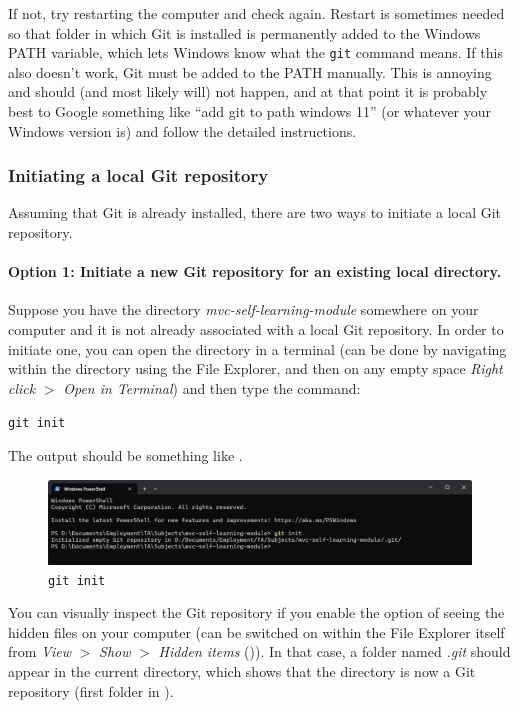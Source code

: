 \documentclass[a4paper,10pt]{article}
\begin{document}
If not, try restarting the computer and check again. Restart is sometimes needed so that folder in which Git is installed is permanently added to the Windows PATH variable, which lets Windows know what the \texttt{git} command means. If this also doesn't work, Git must be added to the PATH manually. This is annoying and should (and most likely will) not happen, and at that point it is probably best to Google something like ``add git to path windows 11'' (or whatever your Windows version is) and follow the detailed instructions.

\subsubsection{Initiating a local Git repository}
\label{sec:git_init}

Assuming that Git is already installed, there are two ways to initiate a local Git repository.

\paragraph{Option 1: Initiate a new Git repository for an existing local directory.} Suppose you have the directory \emph{mvc-self-learning-module} somewhere on your computer and it is not already associated with a local Git repository. In order to initiate one, you can open the directory in a terminal (can be done by navigating within the directory using the File Explorer, and then on any empty space \emph{Right click} $>$ \emph{Open in Terminal}) and then type the command: 

\texttt{git init}

The output should be something like .

\begin{figure}[htbp]
    \centering
    \includegraphics[width=\textwidth]{git_init.png}
    \caption{\texttt{git init}}
    \label{fig:git_init}   
\end{figure}


You can visually inspect the Git repository if you enable the option of seeing the hidden files on your computer (can be switched on within the File Explorer itself from \emph{View} $>$ \emph{Show} $>$ \emph{Hidden items} ()). In that case, a folder named \emph{.git} should appear in the current directory, which shows that the directory is now a Git repository (first folder in ). 
\end{document}
